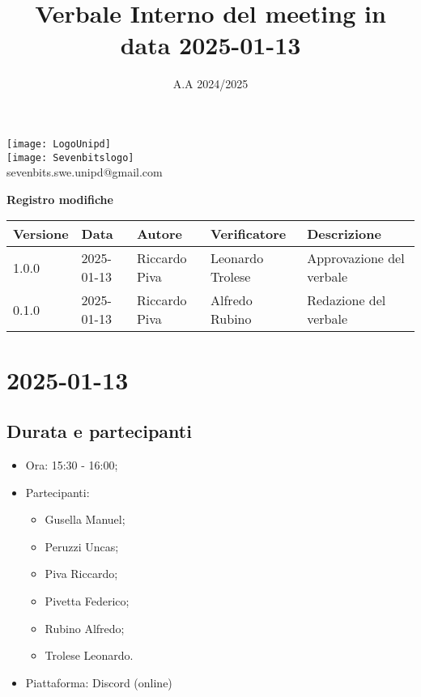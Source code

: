 \documentclass[10pt]{article}
\title{Verbale Interno del meeting in data 2025-01-13}
\date{A.A 2024/2025}
\begin{document}
\maketitle
\begin{center}
\texttt{[image: LogoUnipd]}\\
\texttt{[image: Sevenbitslogo]}\\
sevenbits.swe.unipd@gmail.com\\
\vspace{2mm}

\textbf{Registro modifiche}\\
\vspace{2mm}
\begin{tabularx}{\textwidth}{|l|l|l|l|X|}
\hline
\textbf{Versione} & \textbf{Data} & \textbf{Autore} & \textbf{Verificatore} & \textbf{Descrizione} \\
\hline
1.0.0 & 2025-01-13 & Riccardo Piva & Leonardo Trolese & Approvazione del verbale \\
\hline
0.1.0 & 2025-01-13 & Riccardo Piva & Alfredo Rubino & Redazione del verbale \\
\hline
\end{tabularx}
\end{center}

\newpage
\tableofcontents
\newpage
\section{2025-01-13}
\subsection{Durata e partecipanti}
\begin{itemize}
\item Ora: 15:30 - 16:00;
\item Partecipanti: 	
	\begin{itemize}
		\item Gusella Manuel;
		\item Peruzzi Uncas;
		\item Piva Riccardo;
		\item Pivetta Federico;
		\item Rubino Alfredo;
		\item Trolese Leonardo.
	\end{itemize}
\item Piattaforma: Discord (online)
\end{itemize}
\end{document}
